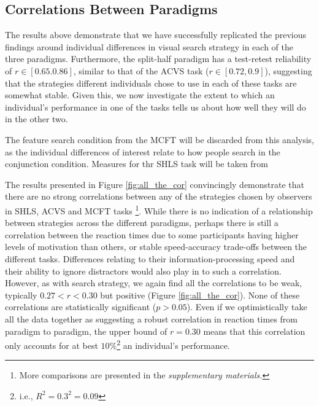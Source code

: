 \documentclass[]{rsos}%
\begin{document}
\subsection{Correlations Between Paradigms}

The results above demonstrate that we have successfully replicated the previous findings around individual differences in visual search strategy in each of the three paradigms. Furthermore, the split-half paradigm has a test-retest reliability of $r \in [0.65. 0.86]$, similar to that of the ACVS task ($r \in [0.72, 0.9]$), suggesting that the strategies different individuals chose to use in each of these tasks are somewhat stable. Given this, we now investigate the extent to which an individual's performance in one of the tasks tells us about how well they will do in the other two. 

The feature search condition from the MCFT will be discarded from this analysis, as the individual differences of interest relate to how people search in the conjunction condition. Measures for thr SHLS task will be taken from 


The results presented in Figure \ref{fig:all_the_cor} convincingly demonstrate that there are no strong correlations between any of the strategies chosen by observers in SHLS, ACVS and MCFT tasks \footnote{More comparisons are presented in the \textit{supplementary materials.}}. 
While there is no indication of a relationship between strategies across the different paradigms, perhaps there is still a correlation between the reaction times due to some participants having higher levels of motivation than others, or stable speed-accuracy trade-offs between the different tasks. Differences relating to their information-processing speed and their ability to ignore distractors would also play in to such a correlation. However, as with search strategy, we again find all the correlations to be weak, typically $0.27 < r <0.30$ but positive (Figure \ref{fig:all_the_cor}). None of these correlations are statistically significant ($p>0.05$). Even if we optimistically take all the data together as suggesting a robust correlation in reaction times from paradigm to paradigm, the upper bound of $r=0.30$ means that this correlation only accounts for at best $10\%$\footnote{i.e., $R^2 = 0.3^2 = 0.09$} an individual's performance. 

\end{document}
